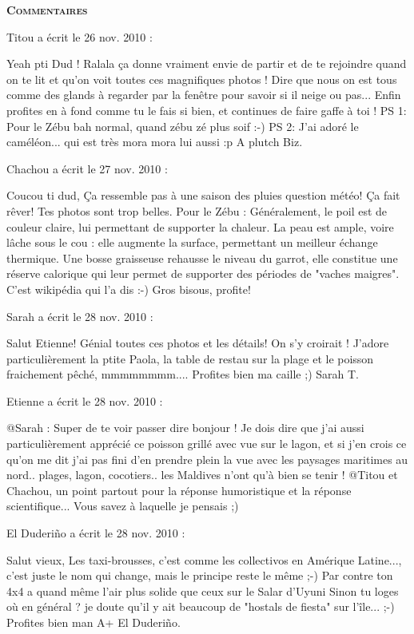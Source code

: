 \bigskip
\textbf{\textsc{Commentaires}}

\medskip
Titou a écrit le 26 nov. 2010 :
\begin{displayquote}
Yeah pti Dud !
Ralala ça donne vraiment envie de partir et de te rejoindre quand on te lit et qu'on voit toutes ces magnifiques photos !
Dire que nous on est tous comme des glands à regarder par la fenêtre pour savoir si il neige ou pas... Enfin profites en à fond comme tu le fais si bien, et continues de faire gaffe à toi !
PS 1: Pour le Zébu bah normal, quand zébu zé plus soif :-)
PS 2: J'ai adoré le caméléon... qui est très mora mora lui aussi :p
A plutch
Biz.
\end{displayquote}

\medskip
Chachou a écrit le 27 nov. 2010 :
\begin{displayquote}
Coucou ti dud,
Ça ressemble pas à une saison des pluies question météo! Ça fait rêver! Tes photos sont trop belles.
Pour le Zébu : Généralement, le poil est de couleur claire, lui permettant de supporter la chaleur. La peau est ample, voire lâche sous le cou : elle augmente la surface, permettant un meilleur échange thermique.
Une bosse graisseuse rehausse le niveau du garrot, elle constitue une réserve calorique qui leur permet de supporter des périodes de "vaches maigres". C'est wikipédia qui l'a dis :-)
Gros bisous, profite!
\end{displayquote}

\medskip
Sarah a écrit le 28 nov. 2010 :
\begin{displayquote}
Salut Etienne!
Génial toutes ces photos et les détails!
On s'y croirait !
J'adore particulièrement la ptite Paola, la table de restau sur la plage et le poisson fraichement pêché, mmmmmmmm....
Profites bien ma caille ;)
Sarah T.
\end{displayquote}

\medskip
Etienne a écrit le 28 nov. 2010 :
\begin{displayquote}
@Sarah : Super de te voir passer dire bonjour ! Je dois dire que j'ai aussi particulièrement apprécié ce poisson grillé avec vue sur le lagon, et si j'en crois ce qu'on me dit j'ai pas fini d'en prendre plein la vue avec les paysages maritimes au nord.. plages, lagon, cocotiers.. les Maldives n'ont qu'à bien se tenir !
@Titou et Chachou, un point partout pour la réponse humoristique et la réponse scientifique... Vous savez à laquelle je pensais ;)
\end{displayquote}

\medskip
El Duderiño a écrit le 28 nov. 2010 :
\begin{displayquote}
Salut vieux,
Les taxi-brousses, c'est comme les collectivos en Amérique Latine..., c'est juste le nom qui change, mais le principe reste le même ;-)
Par contre ton 4x4 a quand même l'air plus solide que ceux sur le Salar d'Uyuni
Sinon tu loges où en général ? je doute qu'il y ait beaucoup de "hostals de fiesta" sur l'île... ;-)
Profites bien man
A+
El Duderiño.
\end{displayquote}

